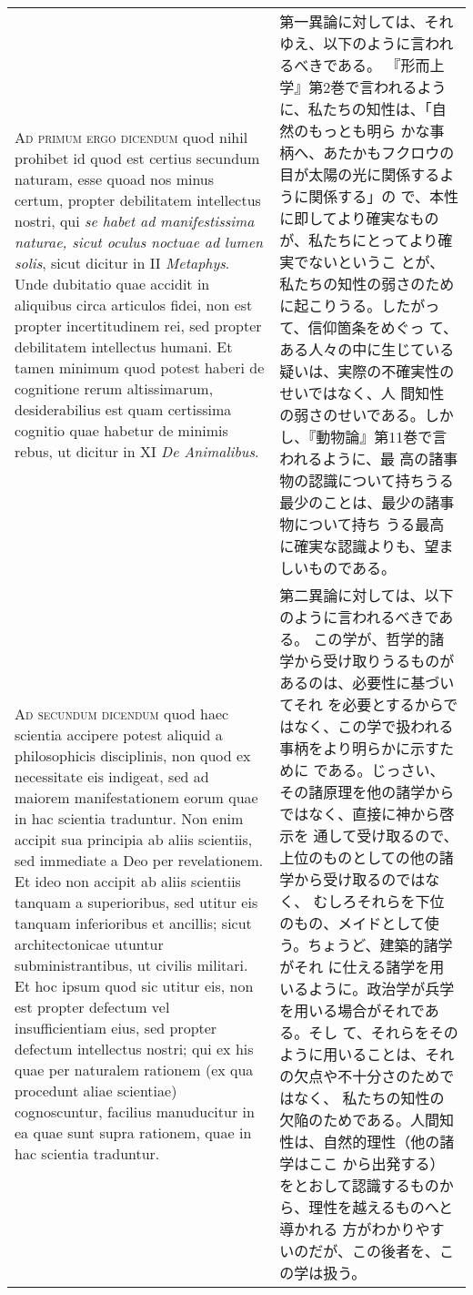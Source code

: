 \documentclass[10pt]{jsarticle} %
\begin{document}
\begin{longtable}{p{21em}p{21em}}
\\


{\scshape Ad primum ergo dicendum} quod nihil prohibet id
quod est certius secundum naturam, esse quoad nos minus certum, propter
debilitatem intellectus nostri, qui {\itshape se habet ad manifestissima naturae,
sicut oculus noctuae ad lumen solis}, sicut dicitur in II {\itshape Metaphys}. Unde
dubitatio quae accidit in aliquibus circa articulos fidei, non est
propter incertitudinem rei, sed propter debilitatem intellectus
humani. Et tamen minimum quod potest haberi de cognitione rerum
altissimarum, desiderabilius est quam certissima cognitio quae habetur
de minimis rebus, ut dicitur in XI {\itshape De Animalibus}.


&


第一異論に対しては、それゆえ、以下のように言われるべきである。
『形而上学』第2巻で言われるように、私たちの知性は、「自然のもっとも明ら
 かな事柄へ、あたかもフクロウの目が太陽の光に関係するように関係する」の
 で、本性に即してより確実なものが、私たちにとってより確実でないというこ
 とが、私たちの知性の弱さのために起こりうる。したがって、信仰箇条をめぐっ
 て、ある人々の中に生じている疑いは、実際の不確実性のせいではなく、人
 間知性の弱さのせいである。しかし、『動物論』第11巻で言われるように、最
 高の諸事物の認識について持ちうる最少のことは、最少の諸事物について持ち
 うる最高に確実な認識よりも、望ましいものである。


\\


{\scshape Ad secundum dicendum} quod haec scientia
accipere potest aliquid a philosophicis disciplinis, non quod ex
necessitate eis indigeat, sed ad maiorem manifestationem eorum quae in
hac scientia traduntur. Non enim accipit sua principia ab aliis
scientiis, sed immediate a Deo per revelationem. Et ideo non accipit ab
aliis scientiis tanquam a superioribus, sed utitur eis tanquam
inferioribus et ancillis; sicut architectonicae utuntur
subministrantibus, ut civilis militari. Et hoc ipsum quod sic utitur
eis, non est propter defectum vel insufficientiam eius, sed propter
defectum intellectus nostri; qui ex his quae per naturalem rationem (ex
qua procedunt aliae scientiae) cognoscuntur, facilius manuducitur in ea
quae sunt supra rationem, quae in hac scientia traduntur.


&


第二異論に対しては、以下のように言われるべきである。
この学が、哲学的諸学から受け取りうるものがあるのは、必要性に基づいてそれ
 を必要とするからではなく、この学で扱われる事柄をより明らかに示すために
 である。じっさい、その諸原理を他の諸学からではなく、直接に神から啓示を
 通して受け取るので、上位のものとしての他の諸学から受け取るのではなく、
 むしろそれらを下位のもの、メイドとして使う。ちょうど、建築的諸学がそれ
 に仕える諸学を用いるように。政治学が兵学を用いる場合がそれである。そし
 て、それらをそのように用いることは、それの欠点や不十分さのためではなく、
 私たちの知性の欠陥のためである。人間知性は、自然的理性（他の諸学はここ
 から出発する）をとおして認識するものから、理性を越えるものへと導かれる
 方がわかりやすいのだが、この後者を、この学は扱う。

\end{longtable}
\newpage
\end{document}
